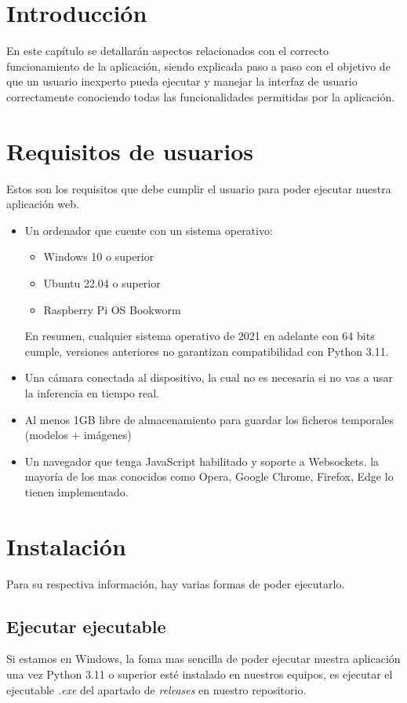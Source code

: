 

\section{Introducción}
En este capítulo se detallarán aspectos relacionados con el correcto funcionamiento de la aplicación, siendo explicada paso a paso con el objetivo de que un usuario inexperto pueda ejecutar y manejar la interfaz de usuario correctamente conociendo todas las funcionalidades permitidas por la aplicación.

\section{Requisitos de usuarios}
Estos son los requisitos que debe cumplir el usuario para poder ejecutar nuestra aplicación web.

\begin{itemize}
    \item Un ordenador que cuente con un sistema operativo:
    \begin{itemize}
        \item Windows 10 o superior
        \item Ubuntu 22.04 o superior
        \item Raspberry Pi OS Bookworm
    \end{itemize}
    En resumen, cualquier sistema operativo de 2021 en adelante con 64 bits cumple, versiones anteriores no garantizan compatibilidad con Python 3.11.

    \item Una cámara conectada al dispositivo, la cual no es necesaria si no vas a usar la inferencia en tiempo real.
    \item Al menos 1GB libre de almacenamiento para guardar los ficheros temporales (modelos + imágenes)
    \item Un navegador que tenga JavaScript habilitado y soporte a Websockets. la mayoría de los mas conocidos como Opera, Google Chrome, Firefox, Edge lo tienen implementado.
    
\end{itemize}

\section{Instalación}
Para su respectiva información, hay varias formas de poder ejecutarlo.
\subsection{Ejecutar ejecutable}
Si estamos en Windows, la foma mas sencilla de poder ejecutar nuestra aplicación una vez Python 3.11 o superior esté instalado en nuestros equipos, es ejecutar el ejecutable \textit{.exe} del apartado de \textit{releases} en nuestro repositorio.

